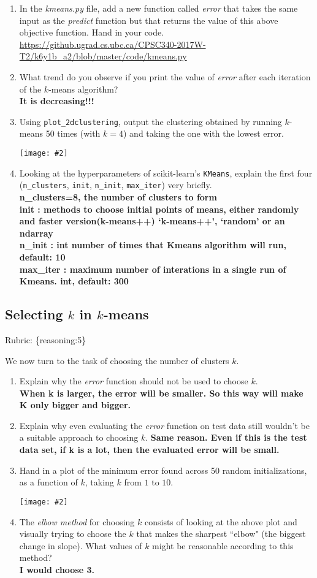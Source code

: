 \documentclass{article}
\def\blu#1{{\color{blu}#1}}
\def\gre#1{{\color{gre}#1}}
\newcommand{\centerfig}[2]{\begin{center}\texttt{[image: \#2]}\end{center}}
\def\enum#1{\begin{enumerate}#1\end{enumerate}}
\def\rubric#1{\gre{Rubric: \{#1\}}}{}
\begin{document}
 \blu{\enum{
 \item In the \emph{kmeans.py} file, add a new function called \emph{error} that takes the same input as the \emph{predict} function but that returns the value of this above objective function. Hand in your code.\\
 \url{https://github.ugrad.cs.ubc.ca/CPSC340-2017W-T2/k6y1b_a2/blob/master/code/kmeans.py}
 \item What trend do you observe if you print the value of \emph{error} after each iteration of the $k$-means algorithm?\\
 \textbf{It is decreasing!!!}
 \item Using \texttt{plot\_2dclustering}, output the clustering obtained by running $k$-means 50 times (with $k=4$) and taking the one with the lowest error.
 \centerfig{.5}{../figs/by_chopa.png}
 \item Looking at the hyperparameters of scikit-learn's \texttt{KMeans}, explain the first four (\texttt{n\_clusters}, \texttt{init}, \texttt{n\_init}, \texttt{max\_iter}) very briefly.\\
\textbf{n\_clusters=8, the number of clusters to form\\init : methods to choose initial points of means, either randomly and faster version(k-means++) {‘k-means++’, ‘random’ or an ndarray}\\n\_init : int number of times that Kmeans algorithm will run, default: 10\\max\_iter : maximum number of interations in a single run of Kmeans. int, default: 300}
}}


 \subsection{Selecting $k$ in $k$-means}
\rubric{reasoning:5}

 We now turn to the task of choosing the number of clusters $k$.

 \blu{\enum{
 \item Explain why the \emph{error} function should not be used to choose $k$.\\
 \textbf{When k is larger, the error will be smaller. So this way will make K only bigger and bigger.}\\
 \item Explain why even evaluating the \emph{error} function on test data still wouldn't be a suitable approach to choosing $k$.
 \textbf{Same reason. Even if this is the test data set, if k is a lot, then the evaluated error will be small. }
 \item Hand in a plot of the minimum error found across 50 random initializations, as a function of $k$, taking $k$ from $1$ to $10$.\\
  \centerfig{.5}{../figs/k_elbow.png}
 \item The \emph{elbow method} for choosing $k$ consists of looking at the above plot and visually trying to choose the $k$ that makes the sharpest ``elbow" (the biggest change in slope). What values of $k$ might be reasonable according to this method? \\
 \textbf{I would choose 3.}
 }}
\end{document}
